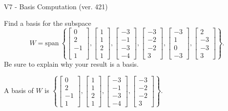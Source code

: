 \begin{exercise}
  \begin{exerciseTitle}V7 - Basis Computation (ver. 421)\end{exerciseTitle}
  \begin{exerciseStatement}
    Find a basis for the subspace 
\[W=\mathrm{span}\ \left\{\left[\begin{array}{r}
0 \\
2 \\
-1 \\
1
\end{array}\right] , \left[\begin{array}{r}
1 \\
1 \\
2 \\
1
\end{array}\right] , \left[\begin{array}{r}
-3 \\
-1 \\
-3 \\
-4
\end{array}\right] , \left[\begin{array}{r}
-3 \\
-2 \\
-2 \\
3
\end{array}\right] , \left[\begin{array}{r}
-3 \\
1 \\
0 \\
-3
\end{array}\right] , \left[\begin{array}{r}
2 \\
-3 \\
-3 \\
3
\end{array}\right]\right\}.\]
 Be sure to explain why your result is a basis.


  \end{exerciseStatement}
  \begin{exerciseAnswer}
   A basis of \(W\) is  \(\left\{\left[\begin{array}{r}
0 \\
2 \\
-1 \\
1
\end{array}\right] , \left[\begin{array}{r}
1 \\
1 \\
2 \\
1
\end{array}\right] , \left[\begin{array}{r}
-3 \\
-1 \\
-3 \\
-4
\end{array}\right] , \left[\begin{array}{r}
-3 \\
-2 \\
-2 \\
3
\end{array}\right]\right\}\).
  


  \end{exerciseAnswer}
\end{exercise}